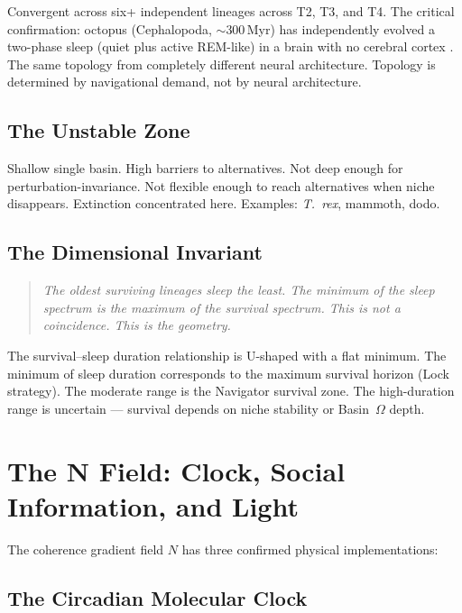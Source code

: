 \documentclass[10pt, a4paper]{article}
\begin{document}
Convergent across six+ independent
lineages across T2, T3, and T4.
The critical confirmation: octopus
(Cephalopoda, $\sim$300\,Myr) has
independently evolved a two-phase
sleep (quiet plus active REM-like)
in a brain with no cerebral cortex
\cite{medeiros2021sleeping}. The same
topology from completely different
neural architecture. Topology is
determined by navigational demand,
not by neural architecture.

\subsection{The Unstable Zone}

Shallow single basin. High barriers
to alternatives. Not deep enough for
perturbation-invariance. Not flexible
enough to reach alternatives when
niche disappears. Extinction concentrated
here. Examples: \textit{T.~rex},
mammoth, dodo.

\subsection{The Dimensional Invariant}

\begin{quote}
\itshape
The oldest surviving lineages sleep the
least. The minimum of the sleep spectrum
is the maximum of the survival spectrum.
This is not a coincidence. This is the
geometry.
\end{quote}

The survival--sleep duration relationship
is U-shaped with a flat minimum. The
minimum of sleep duration corresponds to
the maximum survival horizon (Lock
strategy). The moderate range is the
Navigator survival zone. The high-duration
range is uncertain --- survival depends
on niche stability or Basin~$\Omega$
depth.

\section{The N Field: Clock, Social
Information, and Light}
\label{sec:nfield}

The coherence gradient field $N$
has three confirmed physical
implementations:

\subsection{The Circadian Molecular Clock}
\end{document}
